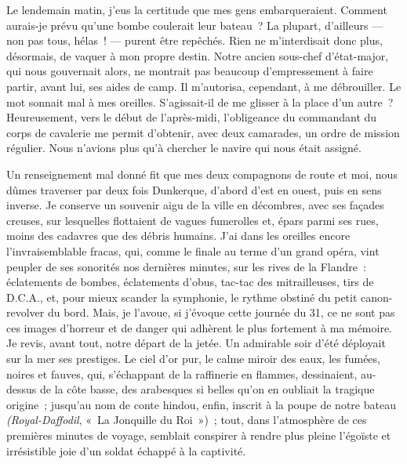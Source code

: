 \documentclass[french,twoside]{book} %
\begin{document}
Le lendemain matin, j’eus la certitude que mes gens embarqueraient. Comment aurais-je prévu qu’une bombe coulerait leur bateau ? La plupart, d’ailleurs — non pas tous, hélas ! — purent être repêchés. Rien ne m’interdisait donc plus, désormais, de vaquer à mon propre destin. Notre ancien sous-chef d’état-major, qui nous gouvernait alors, ne montrait pas beaucoup d’empressement à faire partir, avant lui, ses aides de camp. Il m’autorisa, cependant, à me débrouiller. Le mot sonnait mal à mes oreilles. S’agissait-il de me glisser à la place d’un autre ? Heureusement, vers le début de l’après-midi, l’obligeance du commandant du corps de cavalerie me permit d’obtenir, avec deux camarades, un ordre de mission régulier. Nous n’avions plus qu’à chercher le navire qui nous était assigné.\par
Un renseignement mal donné fit que mes deux compagnons de route et moi, nous dûmes traverser par deux fois Dunkerque, d’abord d’est en ouest, puis en sens inverse. Je conserve un souvenir aigu de la ville en décombres, avec ses façades creuses, sur   lesquelles flottaient de vagues fumerolles et, épars parmi ses rues, moins des cadavres que des débris humains. J’ai dans les oreilles encore l’invraisemblable fracas, qui, comme le finale au terme d’un grand opéra, vint peupler de ses sonorités nos dernières minutes, sur les rives de la Flandre : éclatements de bombes, éclatements d’obus, tac-tac des mitrailleuses, tirs de D.C.A., et, pour mieux scander la symphonie, le rythme obstiné du petit canon-revolver du bord. Mais, je l’avoue, si j’évoque cette journée du 31, ce ne sont pas ces images d’horreur et de danger qui adhèrent le plus fortement à ma mémoire. Je revis, avant tout, notre départ de la jetée. Un admirable soir d’été déployait sur la mer ses prestiges. Le ciel d’or pur, le calme miroir des eaux, les fumées, noires et fauves, qui, s’échappant de la raffinerie en flammes, dessinaient, au-dessus de la côte basse, des arabesques si belles qu’on en oubliait la tragique origine ; jusqu’au nom de conte hindou, enfin, inscrit à la poupe de notre bateau \emph{(Royal-Daffodil}, « La Jonquille du Roi ») ; tout, dans l’atmosphère de ces premières minutes de voyage, semblait conspirer à rendre plus pleine l’égoïste et irrésistible joie d’un soldat échappé à la captivité.\par
\end{document}
